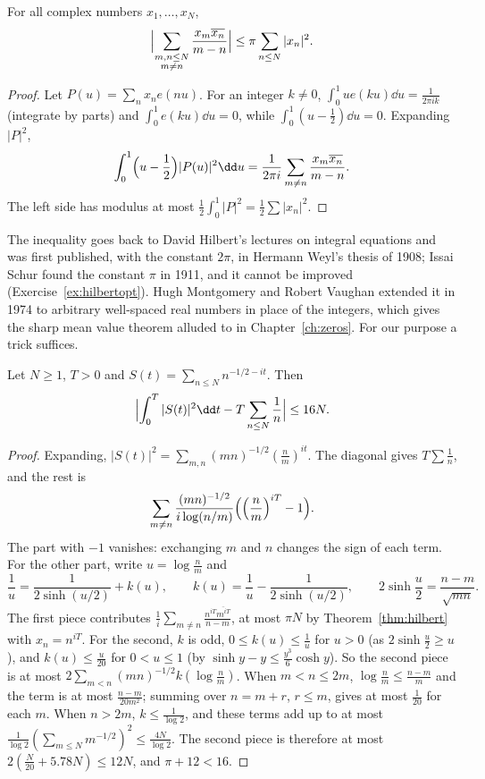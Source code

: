 \begin{theorem}\label{thm:hilbert}
For all complex numbers $x_1,\dots,x_N$,
\[
\Bigl|\sum_{\substack{m,n\le N\\m\ne n}}\frac{x_m\overline{x_n}}{m-n}\Bigr|\le\pi\sum_{n\le N}|x_n|^2.
\]
\end{theorem}
\begin{proof}
Let $P(u)=\sum_nx_ne(nu)$. For an integer $k\ne0$, $\int_0^1ue(ku)\dd u=\frac1{2\pi ik}$ (integrate by parts) and $\int_0^1e(ku)\dd u=0$, while $\int_0^1(u-\frac12)\dd u=0$. Expanding $|P|^2$,
\[
\int_0^1\Bigl(u-\frac12\Bigr)|P(u)|^2\dd u=\frac1{2\pi i}\sum_{m\ne n}\frac{x_m\overline{x_n}}{m-n}.
\]
The left side has modulus at most $\frac12\int_0^1|P|^2=\frac12\sum|x_n|^2$.
\end{proof}

The inequality goes back to David Hilbert's lectures on integral equations and was first published, with the constant $2\pi$, in Hermann Weyl's thesis of 1908; Issai Schur found the constant $\pi$ in 1911, and it cannot be improved (Exercise~\ref{ex:hilbertopt}). Hugh Montgomery and Robert Vaughan extended it in 1974 to arbitrary well-spaced real numbers in place of the integers, which gives the sharp mean value theorem alluded to in Chapter~\ref{ch:zeros}. For our purpose a trick suffices.

\begin{proposition}\label{prop:meansqpoly}
Let $N\ge1$, $T>0$ and $S(t)=\sum_{n\le N}n^{-1/2-it}$. Then
\[
\Bigl|\int_0^T|S(t)|^2\dd t-T\sum_{n\le N}\frac1n\Bigr|\le16N.
\]
\end{proposition}
\begin{proof}
Expanding, $|S(t)|^2=\sum_{m,n}(mn)^{-1/2}(\frac nm)^{it}$. The diagonal gives $T\sum\frac1n$, and the rest is
\[
\sum_{m\ne n}\frac{(mn)^{-1/2}}{i\log(n/m)}\Bigl(\Bigl(\frac nm\Bigr)^{iT}-1\Bigr).
\]
The part with $-1$ vanishes: exchanging $m$ and $n$ changes the sign of each term. For the other part, write $u=\log\frac nm$ and
\[
\frac1u=\frac1{2\sinh(u/2)}+k(u),\qquad k(u)=\frac1u-\frac1{2\sinh(u/2)},\qquad2\sinh\frac u2=\frac{n-m}{\sqrt{mn}}.
\]
The first piece contributes $\frac1i\sum_{m\ne n}\frac{n^{iT}\overline{m^{iT}}}{n-m}$, at most $\pi N$ by Theorem~\ref{thm:hilbert} with $x_n=n^{iT}$. For the second, $k$ is odd, $0\le k(u)\le\frac1u$ for $u>0$ (as $2\sinh\frac u2\ge u$), and $k(u)\le\frac u{20}$ for $0<u\le1$ (by $\sinh y-y\le\frac{y^3}6\cosh y$). So the second piece is at most $2\sum_{m<n}(mn)^{-1/2}k(\log\frac nm)$. When $m<n\le2m$, $\log\frac nm\le\frac{n-m}m$ and the term is at most $\frac{n-m}{20m^2}$; summing over $n=m+r$, $r\le m$, gives at most $\frac1{20}$ for each $m$. When $n>2m$, $k\le\frac1{\log2}$, and these terms add up to at most $\frac1{\log2}(\sum_{m\le N}m^{-1/2})^2\le\frac{4N}{\log2}$. The second piece is therefore at most $2(\frac N{20}+5.78N)\le12N$, and $\pi+12<16$.
\end{proof}


